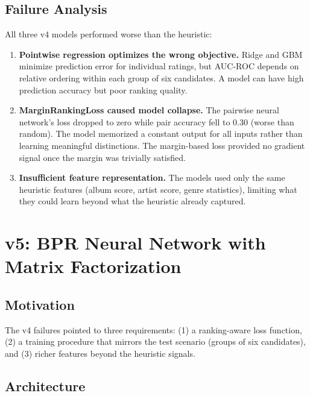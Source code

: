 \documentclass[12pt]{article}
\begin{document}
\newpage
\subsection{Failure Analysis}

All three v4 models performed worse than the heuristic:

\begin{enumerate}
	\item \textbf{Pointwise regression optimizes the wrong objective.} Ridge and GBM minimize prediction error for individual ratings, but AUC-ROC depends on relative ordering within each group of six candidates. A model can have high prediction accuracy but poor ranking quality.

	\item \textbf{MarginRankingLoss caused model collapse.} The pairwise neural network's loss dropped to zero while pair accuracy fell to 0.30 (worse than random). The model memorized a constant output for all inputs rather than learning meaningful distinctions. The margin-based loss provided no gradient signal once the margin was trivially satisfied.

	\item \textbf{Insufficient feature representation.} The models used only the same heuristic features (album score, artist score, genre statistics), limiting what they could learn beyond what the heuristic already captured.
\end{enumerate}

\newpage
\section{v5: BPR Neural Network with Matrix Factorization}

\subsection{Motivation}

The v4 failures pointed to three requirements: (1) a ranking-aware loss function, (2) a training procedure that mirrors the test scenario (groups of six candidates), and (3) richer features beyond the heuristic signals.

\subsection{Architecture}
\end{document}
